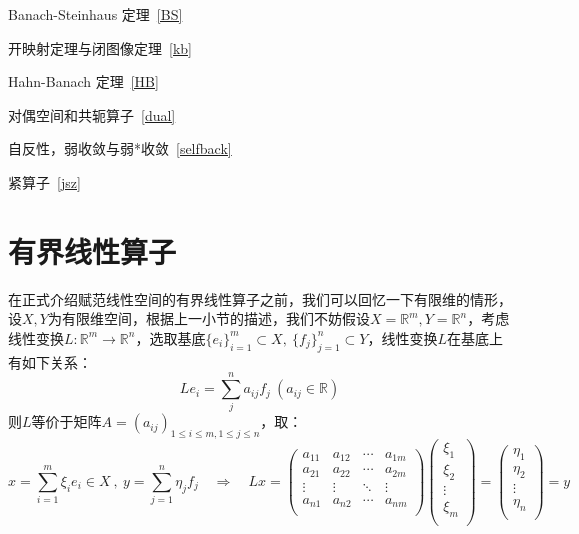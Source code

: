 \begin{introduction}
    \item Banach-Steinhaus 定理~\ref{BS}
    \item 开映射定理与闭图像定理~\ref{kb}
    \item Hahn-Banach 定理~\ref{HB}
    \item 对偶空间和共轭算子~\ref{dual}
    \item 自反性，弱收敛与弱*收敛~\ref{selfback}
    \item 紧算子~\ref{jsz}
\end{introduction}
\section{有界线性算子}\label{BX}
在正式介绍赋范线性空间的有界线性算子之前，我们可以回忆一下有限维的情形，设$X,Y$为有限维空间，根据上一小节的描述，我们不妨假设$X=\mathbb{R}^m,Y=\mathbb{R}^n$，考虑线性变换$L:\mathbb{R}^m \to \mathbb{R}^n$，选取基底$\{e_i\}_{i=1}^m \subset X , \ \{f_j\}_{j=1}^n \subset Y$，线性变换$L$在基底上有如下关系：
\[Le_i=\sum_j^na_{ij}f_j \ (a_{ij} \in \mathbb{R})\]
则$L$等价于矩阵$A=(a_{ij})_{1 \leq i \leq m , 1 \leq j \leq n}$，取：
\[x=\sum_{i=1}^m\xi_ie_i \in X \ , \ y=\sum_{j=1}^n\eta_jf_j \quad \Rightarrow \quad Lx=
\begin{pmatrix}
    a_{11} & a_{12} & \cdots & a_{1m} \\
    a_{21} & a_{22} & \cdots & a_{2m} \\
    \vdots & \vdots & \ddots & \vdots \\
    a_{n1} & a_{n2} & \cdots & a_{nm} \\
\end{pmatrix}
\begin{pmatrix}
    \xi_1 \\ \xi_2 \\ \vdots \\ \xi_m \\
\end{pmatrix}
=\begin{pmatrix}
    \eta_1 \\ \eta_2 \\ \vdots \\ \eta_n \\
\end{pmatrix}
=y
\]

